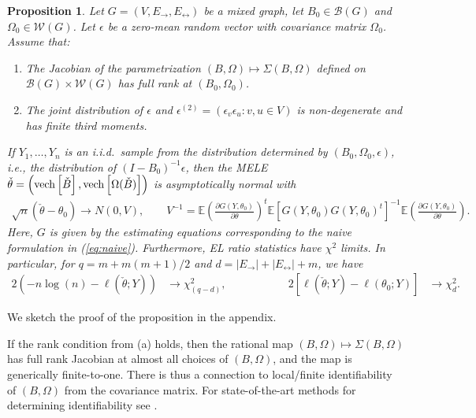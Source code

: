 \documentclass[notitlepage]{article}
\newtheorem{proposition}{Proposition}
\newcommand{\ve}{{\rm vech}}       %
\begin{document}
\begin{proposition}\label{lem:conditions}
  Let $G=(V,E_\rightarrow,E_\leftrightarrow)$ be a mixed graph, let
  $B_0\in\mathcal{B}(G)$ and $\Omega_0\in\mathcal{W}(G)$.  Let
  $\epsilon$ be a zero-mean random vector with covariance matrix
  $\Omega_0$.  Assume that:
  \begin{enumerate}[label=(\alph*)]
  \item The Jacobian of the parametrization
    $(B,\Omega)\mapsto \Sigma(B,\Omega)$ defined on
    $\mathcal{B}(G)\times\mathcal{W}(G)$ has full rank at
    $(B_0,\Omega_0)$.
  \item The joint distribution of $\epsilon$ and
    $\epsilon^{(2)}=(\epsilon_v\epsilon_u: v,u\in V)$ is
    non-degenerate and has finite third moments.
  \end{enumerate}
  If $Y_1,\dots,Y_n$ is an i.i.d.~sample from the distribution
  determined by $(B_0,\Omega_0,\epsilon)$, i.e., the distribution of
  $(I-B_0)^{-1}\epsilon$, then the MELE
  $\check \theta = \left(\ve \left[ \check B \right], \ve \left[
      \Omega (\check B) \right] \right)$ is asymptotically
  normal with
\begin{equation}
\begin{aligned}
  \sqrt{n}\left(\check \theta - \theta_0\right) \rightarrow N(0, V), \qquad
  V^{-1} = \mathbb{E}\left( \frac{\partial G(Y, \theta_0)}{\partial \theta}\right)^t \mathbb{E}[G(Y, \theta_0)G(Y, \theta_0)^t]^{-1} \mathbb{E}\left( \frac{\partial G(Y, \theta_0)}{\partial \theta}\right).
\end{aligned}
\end{equation}
Here, $G$ is given by the estimating equations corresponding to the
naive formulation in (\ref{eq:naive}). Furthermore, EL
ratio statistics have $\chi^2$ limits.  In particular, for
$q = m + m(m + 1)/2$ and
$d = |E_\rightarrow| + |E_\leftrightarrow| + m$, we have
\begin{equation}
\begin{aligned}
2 \left(-n\log(n) - \ell(\check \theta; Y)  \right) &\rightarrow \chi^2_{(q - d)}, & \qquad \qquad  & 2 \left[\ell(\check \theta; Y) -  \ell(\theta_0; Y) \right] &\rightarrow \chi^2_d.
 \end{aligned}
 \end{equation}
\end{proposition}

We sketch the proof of the proposition in the appendix.

If the rank condition from (a) holds, then the rational map
$(B,\Omega)\mapsto \Sigma(B,\Omega)$ has full rank Jacobian at almost
all choices of $(B,\Omega)$, and the map is generically finite-to-one.
There is thus a connection to local/finite identifiability of
$(B,\Omega)$ from the covariance matrix.  For state-of-the-art methods
for determining identifiability see
\cite{foygel2012half,chen2016old,drton:weihs:2016}.
\end{document}
